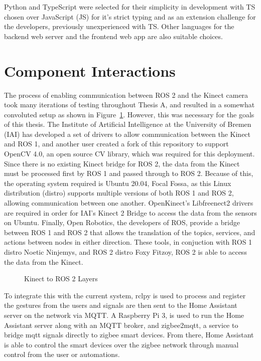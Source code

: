 Python and TypeScript were selected for their simplicity in development with TS chosen over JavaScript (JS) for it's strict typing and as an extension challenge for the developers, previously unexperienced with TS.
Other languages for the backend web server and the frontend web app are also suitable choices.

\section{Component Interactions}

The process of enabling communication between ROS 2 and the Kinect camera took many iterations of testing throughout Thesis A, and resulted in a somewhat convoluted setup as shown in Figure~\ref{fig:kinect_ros}.
However, this was necessary for the goals of this thesis.
The Institute of Artificial Intelligence at the University of Bremen (IAI) has developed a set of drivers to allow communication between the Kinect and ROS 1, and another user created a fork of this repository to support OpenCV 4.0, an open source CV library, which was required for this deployment.
Since there is no existing Kinect bridge for ROS 2, the data from the Kinect must be processed first by ROS 1 and passed through to ROS 2. Because of this, the operating system required is Ubuntu 20.04, Focal Fossa, as this Linux distribution (distro) supports multiple versions of both ROS 1 and ROS 2, allowing communication between one another.
OpenKinect's Libfreenect2 drivers are required in order for IAI's Kinect 2 Bridge to access the data from the sensors on Ubuntu.
Finally, Open Robotics, the developers of ROS, provide a bridge between ROS 1 and ROS 2 that allows the translation of the topics, services, and actions between nodes in either direction.
These tools, in conjuction with ROS 1 distro Noetic Ninjemys, and ROS 2 distro Foxy Fitzoy, ROS 2 is able to access the data from the Kinect.

\begin{figure}[!htb]
    \caption{Kinect to ROS 2 Layers}
    \label{fig:kinect_ros}
\end{figure}

To integrate this with the current system, rclpy is used to process and register the gestures from the users and signals are then sent to the Home Assistant server on the network via MQTT.
A Raspberry Pi 3, is used to run the Home Assistant server along with an MQTT broker, and zigbee2mqtt, a service to bridge mqtt signals directly to zigbee smart devices.
From there, Home Assistant is able to control the smart devices over the zigbee network through manual control from the user or automations.


